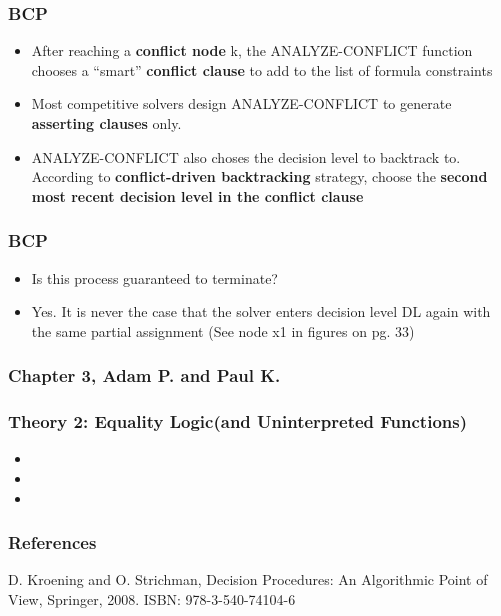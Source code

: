 \documentclass{beamer}
\begin{document}
\begin{frame}

 \frametitle{BCP}
 
 \begin{itemize}
 
 \item  After reaching a \textbf{conflict node} k, the ANALYZE-CONFLICT function chooses a ``smart'' \textbf{conflict clause} to add to the list of formula constraints
 
 \item Most competitive solvers design ANALYZE-CONFLICT to generate \textbf{asserting clauses} only.
 \item ANALYZE-CONFLICT also choses the decision level to backtrack to.  According to \textbf{conflict-driven backtracking} strategy, choose the \textbf{second most recent decision level in the conflict clause}
 \end{itemize}
 
\end{frame}

\begin{frame}

 \frametitle{BCP}
 
 \begin{itemize}
 
 \item  Is this process guaranteed to terminate?
 \item  Yes.  It is never the case that the solver enters decision level DL again with the same partial assignment (See node x1 in figures on pg. 33)
 
 \end{itemize}
 
\end{frame}


\begin{frame}
 \frametitle {Chapter 3, Adam P. and Paul K.}
\end{frame}

\begin{frame}

 \frametitle{Theory 2:  Equality Logic(and Uninterpreted Functions)}
 
 \begin{itemize}
 \item 
 \item 
 \item 
 \end{itemize}
 
\end{frame}

\nocite{Coker::Principles-of-R,Haldar:04:Semantic-Remote,Fabrega:1999aa,Ryan:09:Introduction-to}

\begin{frame}
  \frametitle{References}
  
  D. Kroening and O. Strichman, Decision Procedures: An Algorithmic Point of View, Springer, 2008. ISBN: 978-3-540-74104-6
\end{frame}
\end{document}
